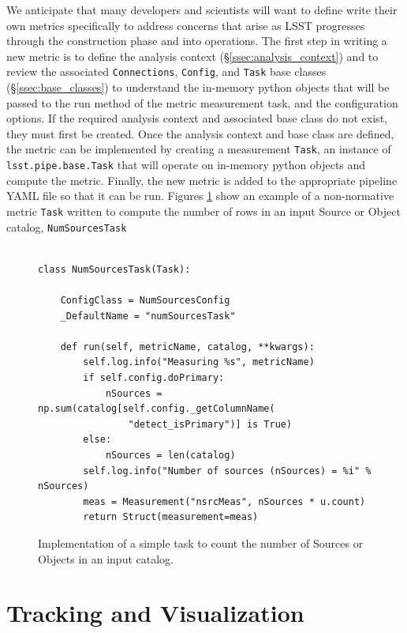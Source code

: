 We anticipate that many developers and scientists will want to define write their own metrics specifically to address concerns that arise as LSST progresses through the construction phase and into operations.
The first step in writing a new metric is to define the analysis context (\S \ref{ssec:analysis_context}) and to review the associated \texttt{Connections},  \texttt{Config}, and  \texttt{Task} base classes (\S \ref{ssec:base_classes}) to understand the in-memory python objects that will be passed to the run method of the metric measurement task, and the configuration options.
If the required analysis context and associated base class do not exist, they must first be created. 
Once the analysis context and base class are defined, the metric can be implemented by creating a measurement \texttt{Task}, an instance of \texttt{lsst.pipe.base.Task} that will operate on in-memory python objects and compute the metric. 
Finally, the new metric is added to the appropriate pipeline YAML file so that it can be run.
Figures \ref{fig:num_sources_task} show an example of a non-normative metric \texttt{Task} written to compute the number of rows in an input Source or Object catalog, \texttt{NumSourcesTask}

\begin{figure}[!htp]
  \lstset{language=python}
  \begin{lstlisting}
  
class NumSourcesTask(Task):

    ConfigClass = NumSourcesConfig
    _DefaultName = "numSourcesTask"

    def run(self, metricName, catalog, **kwargs):
        self.log.info("Measuring %s", metricName)
        if self.config.doPrimary:
            nSources = np.sum(catalog[self.config._getColumnName(
                "detect_isPrimary")] is True)
        else:
            nSources = len(catalog)
        self.log.info("Number of sources (nSources) = %i" % nSources)
        meas = Measurement("nsrcMeas", nSources * u.count)
        return Struct(measurement=meas)    \end{lstlisting}
        
  \caption{Implementation of a simple task to count the number of Sources or Objects in an input catalog. }
  \label{fig:num_sources_task}
  \par\medskip
\end{figure}

\section{Tracking and Visualization} \label{sec:tracking}

